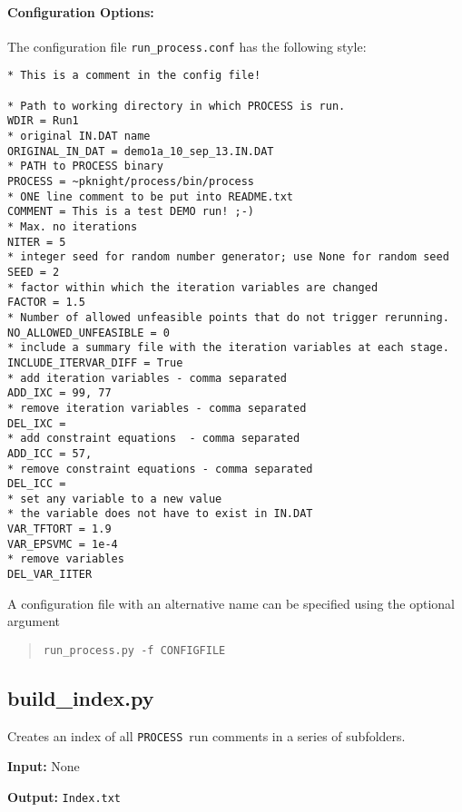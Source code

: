 \documentclass[11pt,a4paper]{report}
\newcommand{\process}{\mbox{\texttt{PROCESS}}}
\begin{document}
\paragraph{Configuration Options:}

The configuration file \texttt{run\_process.conf} has the following style:
\begin{framed}
\begin{verbatim}
* This is a comment in the config file!

* Path to working directory in which PROCESS is run.
WDIR = Run1
* original IN.DAT name 
ORIGINAL_IN_DAT = demo1a_10_sep_13.IN.DAT
* PATH to PROCESS binary
PROCESS = ~pknight/process/bin/process
* ONE line comment to be put into README.txt
COMMENT = This is a test DEMO run! ;-)
* Max. no iterations
NITER = 5
* integer seed for random number generator; use None for random seed
SEED = 2
* factor within which the iteration variables are changed
FACTOR = 1.5
* Number of allowed unfeasible points that do not trigger rerunning.
NO_ALLOWED_UNFEASIBLE = 0 
* include a summary file with the iteration variables at each stage.
INCLUDE_ITERVAR_DIFF = True
* add iteration variables - comma separated
ADD_IXC = 99, 77
* remove iteration variables - comma separated
DEL_IXC = 
* add constraint equations  - comma separated 
ADD_ICC = 57,
* remove constraint equations - comma separated
DEL_ICC =
* set any variable to a new value
* the variable does not have to exist in IN.DAT
VAR_TFTORT = 1.9
VAR_EPSVMC = 1e-4
* remove variables
DEL_VAR_IITER
\end{verbatim}
\end{framed}
A configuration file with an alternative name can be specified using the optional argument
\begin{quote}
\begin{verbatim}
run_process.py -f CONFIGFILE
\end{verbatim}
\end{quote}

\subsection{build\_index.py}

Creates an index of all \process\ run comments in a series of subfolders.

\begin{description}
\item{\textbf{Input:}}
None
                                
\item{\textbf{Output:}}
\verb|Index.txt|
\end{description}
\end{document}
